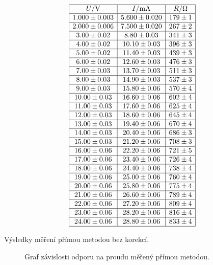 \documentclass[a4paper,12pt]{article}
\begin{document}
\begin{table}
$$
\begin{array}{|c|c|c|}
\hline
U/\mbox{V}& I/\mbox{mA}&    R/\Omega \\ \hline
1.000\pm 0.003&5.600\pm 0.020&179\pm1\\ \hline
2.000\pm 0.006&7.500\pm 0.020&267\pm2\\ \hline
3.00\pm 0.02&8.80\pm 0.03&341\pm3\\ \hline
4.00\pm 0.02&10.10\pm 0.03&396\pm3\\ \hline
5.00\pm 0.02&11.40\pm 0.03&439\pm3\\ \hline
6.00\pm 0.02&12.60\pm 0.03&476\pm3\\ \hline
7.00\pm 0.03&13.70\pm 0.03&511\pm3\\ \hline
8.00\pm 0.03&14.90\pm 0.03&537\pm3\\ \hline
9.00\pm 0.03&15.80\pm 0.06&570\pm4\\ \hline
10.00\pm 0.03&16.60\pm 0.06&602\pm4\\ \hline
11.00\pm 0.03&17.60\pm 0.06&625\pm4\\ \hline
12.00\pm 0.03&18.60\pm 0.06&645\pm4\\ \hline
13.00\pm 0.03&19.40\pm 0.06&670\pm4\\ \hline
14.00\pm 0.03&20.40\pm 0.06&686\pm3\\ \hline
15.00\pm 0.03&21.20\pm 0.06&708\pm3\\ \hline
16.00\pm 0.06&22.20\pm 0.06&721\pm5\\ \hline
17.00\pm 0.06&23.40\pm 0.06&726\pm4\\ \hline
18.00\pm 0.06&24.40\pm 0.06&738\pm4\\ \hline
19.00\pm 0.06&25.00\pm 0.06&760\pm4\\ \hline
20.00\pm 0.06&25.80\pm 0.06&775\pm4\\ \hline
21.00\pm 0.06&26.60\pm 0.06&789\pm4\\ \hline
22.00\pm 0.06&27.20\pm 0.06&809\pm4\\ \hline
23.00\pm 0.06&28.20\pm 0.06&816\pm4\\ \hline
24.00\pm 0.06&28.80\pm 0.06&833\pm4\\ \hline
\end{array}
$$
\caption{Výsledky měření přímou metodou bez korekcí.}
\label{TUk1}
\end{table}

\begin{figure}

\caption{Graf závislosti odporu na proudu měřený přímou metodou.}
\label{g1}
\end{figure}
\end{document}
